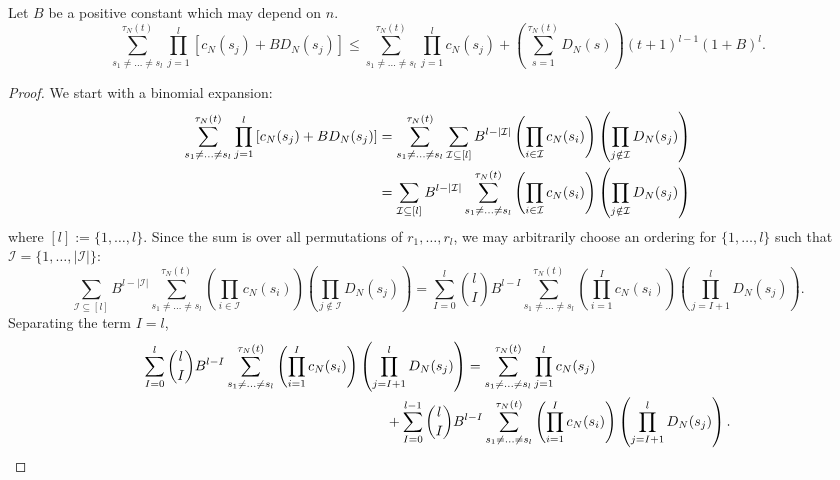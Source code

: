 \documentclass{article}
\newcommand{\1}[1]{\mathbbm{1}_{#1}}
\begin{document}
\begin{lemma}\label{thm:cleanup2}
Let $B$ be a positive constant which may depend on $n$.
\begin{equation}
\sum_{s_1\neq\dots\neq s_l}^{\tau_N(t)} \prod_{j=1}^l 
        \left[ c_N(s_j) + B D_N(s_j) \right]
\leq \sum_{s_1\neq\dots\neq s_l}^{\tau_N(t)} \prod_{j=1}^l c_N(s_j)
        + \left( \sum_{s=1}^{\tau_N(t)} D_N(s) \right) (t+1)^{l-1} (1+B)^l .
\end{equation}
\end{lemma}

\begin{proof}
We start with a binomial expansion:
\begin{align}
\sum_{s_1\neq\dots\neq s_l}^{\tau_N(t)} \prod_{j=1}^l 
        \left[ c_N(s_j) + B D_N(s_j) \right]
&= \sum_{s_1\neq\dots\neq s_l}^{\tau_N(t)} \sum_{\mathcal{I} \subseteq [l]}
        B^{l-|\mathcal{I}|} \left( \prod_{i\in\mathcal{I}} c_N(s_i) \right)
        \left( \prod_{j\notin\mathcal{I}} D_N(s_j) \right) \notag\\
&= \sum_{\mathcal{I} \subseteq [l]} B^{l-|\mathcal{I}|}
        \sum_{s_1\neq\dots\neq s_l}^{\tau_N(t)}
        \left( \prod_{i\in\mathcal{I}} c_N(s_i) \right)
        \left( \prod_{j\notin\mathcal{I}} D_N(s_j) \right) \label{eq:010}
\end{align}
where $[l] := \{1,\dots,l\}$. Since the sum is over all permutations of $r_1,\dots,r_l$, we may arbitrarily choose an ordering for $\{1,\dots,l\}$ such that $\mathcal{I} = \{ 1,\dots, |\mathcal{I}| \}$:
\begin{equation}
\sum_{\mathcal{I} \subseteq [l]} B^{l-|\mathcal{I}|}
        \sum_{s_1\neq\dots\neq s_l}^{\tau_N(t)}
        \left( \prod_{i\in\mathcal{I}} c_N(s_i) \right)
        \left( \prod_{j\notin\mathcal{I}} D_N(s_j) \right)
= \sum_{I=0}^l \binom{l}{I} B^{l-I} \sum_{s_1\neq\dots\neq s_l}^{\tau_N(t)}
        \left( \prod_{i=1}^I c_N(s_i) \right)
        \left( \prod_{j=I+1}^l D_N(s_j) \right) .
\end{equation}
Separating the term $I=l$,
\begin{align}
\sum_{I=0}^l \binom{l}{I} B^{l-I} \sum_{s_1\neq\dots\neq s_l}^{\tau_N(t)}
        \left( \prod_{i=1}^I c_N(s_i) \right)
        &\left( \prod_{j=I+1}^l D_N(s_j) \right)
= \sum_{s_1\neq\dots\neq s_l}^{\tau_N(t)} \prod_{j=1}^l c_N(s_j) \notag\\
&\qquad+ \sum_{I=0}^{l-1} \binom{l}{I} B^{l-I} 
        \sum_{s_1\neq\dots\neq s_l}^{\tau_N(t)}
        \left( \prod_{i=1}^I c_N(s_i) \right) \left( \prod_{j=I+1}^l D_N(s_j) \right). \label{eq:012}

\end{align}
\end{proof}
\end{document}
